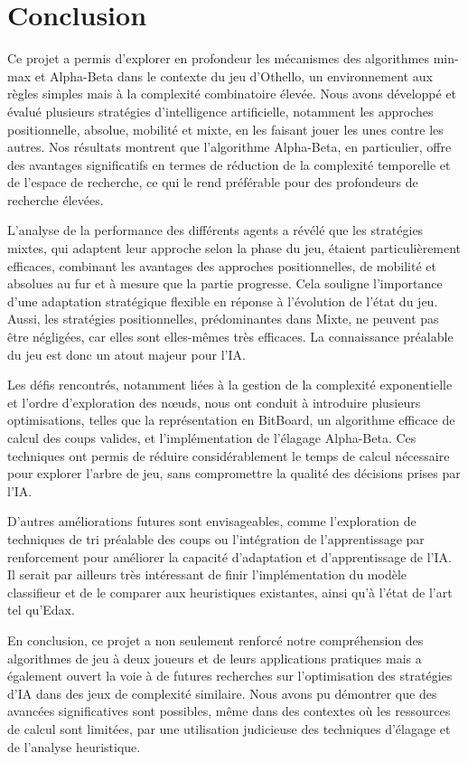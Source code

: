 \chapter{Conclusion}
\label{chap:conclusion}

Ce projet a permis d'explorer en profondeur les mécanismes des algorithmes min-max et Alpha-Beta dans le contexte du jeu d'Othello, un environnement aux règles simples mais à la complexité combinatoire élevée. Nous avons développé et évalué plusieurs stratégies d'intelligence artificielle, notamment les approches positionnelle, absolue, mobilité et mixte, en les faisant jouer les unes contre les autres. Nos résultats montrent que l'algorithme Alpha-Beta, en particulier, offre des avantages significatifs en termes de réduction de la complexité temporelle et de l'espace de recherche, ce qui le rend préférable pour des profondeurs de recherche élevées.

L'analyse de la performance des différents agents a révélé que les stratégies mixtes, qui adaptent leur approche selon la phase du jeu, étaient particulièrement efficaces, combinant les avantages des approches positionnelles, de mobilité et absolues au fur et à mesure que la partie progresse. Cela souligne l'importance d'une adaptation stratégique flexible en réponse à l'évolution de l'état du jeu. Aussi, les stratégies positionnelles, prédominantes dans Mixte, ne peuvent pas être négligées, car elles sont elles-mêmes très efficaces. La connaissance préalable du jeu est donc un atout majeur pour l'\ac{IA}.

Les défis rencontrés, notamment liées à la gestion de la complexité exponentielle et l'ordre d'exploration des nœuds, nous ont conduit à introduire plusieurs optimisations, telles que la représentation en BitBoard, un algorithme efficace de calcul des coups valides, et l'implémentation de l'élagage Alpha-Beta. Ces techniques ont permis de réduire considérablement le temps de calcul nécessaire pour explorer l'arbre de jeu, sans compromettre la qualité des décisions prises par l'\ac{IA}.

D'autres améliorations futures sont envisageables, comme l'exploration de techniques de tri préalable des coups ou l'intégration de l'apprentissage par renforcement pour améliorer la capacité d'adaptation et d'apprentissage de l'\ac{IA}. Il serait par ailleurs très intéressant de finir l'implémentation du modèle classifieur et de le comparer aux heuristiques existantes, ainsi qu'à l'état de l'art tel qu'Edax.

En conclusion, ce projet a non seulement renforcé notre compréhension des algorithmes de jeu à deux joueurs et de leurs applications pratiques mais a également ouvert la voie à de futures recherches sur l'optimisation des stratégies d'\ac{IA} dans des jeux de complexité similaire. Nous avons pu démontrer que des avancées significatives sont possibles, même dans des contextes où les ressources de calcul sont limitées, par une utilisation judicieuse des techniques d'élagage et de l'analyse heuristique.

